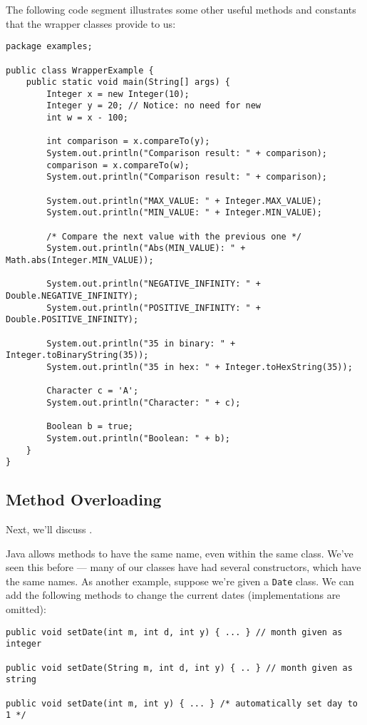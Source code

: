 The following code segment illustrates some other useful methods and constants that the wrapper classes provide to us:

\begin{lstlisting}
package examples;

public class WrapperExample {
	public static void main(String[] args) {
		Integer x = new Integer(10);
		Integer y = 20; // Notice: no need for new
		int w = x - 100;

		int comparison = x.compareTo(y);
		System.out.println("Comparison result: " + comparison);
		comparison = x.compareTo(w);
		System.out.println("Comparison result: " + comparison);

		System.out.println("MAX_VALUE: " + Integer.MAX_VALUE);
		System.out.println("MIN_VALUE: " + Integer.MIN_VALUE);

		/* Compare the next value with the previous one */
		System.out.println("Abs(MIN_VALUE): " + Math.abs(Integer.MIN_VALUE));

		System.out.println("NEGATIVE_INFINITY: " + Double.NEGATIVE_INFINITY);
		System.out.println("POSITIVE_INFINITY: " + Double.POSITIVE_INFINITY);

		System.out.println("35 in binary: " + Integer.toBinaryString(35));
		System.out.println("35 in hex: " + Integer.toHexString(35));

		Character c = 'A';
		System.out.println("Character: " + c);

		Boolean b = true;
		System.out.println("Boolean: " + b);
	}
}
\end{lstlisting}

\subsection{Method Overloading}

Next, we'll discuss . 

Java allows methods to have the same name, even within the same class. We've seen this before --- many of our classes have had several constructors, which have the same names. As another example, suppose we're given a \verb!Date! class. We can add the following methods to change the current dates (implementations are omitted):

\begin{lstlisting}
public void setDate(int m, int d, int y) { ... } // month given as integer

public void setDate(String m, int d, int y) { .. } // month given as string

public void setDate(int m, int y) { ... } /* automatically set day to 1 */
\end{lstlisting}

